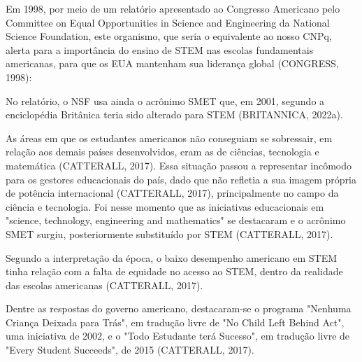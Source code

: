 Em 1998, por meio de um relatório apresentado ao Congresso Americano pelo Committee on Equal Opportunities in Science and Engineering da National Science Foundation, este organismo, que seria o equivalente ao nosso CNPq, alerta para a importância do ensino de STEM nas escolas fundamentais americanas, para que os EUA mantenham sua liderança global  (CONGRESS, 1998):


\noindent\begin{flushright}\mbox{\linespread{1}\selectfont\centering{}}\end{flushright}


No relatório, o NSF usa ainda o acrônimo SMET que, em 2001, segundo a enciclopédia Britânica teria sido alterado para STEM (BRITANNICA, 2022a).

As áreas em que os estudantes americanos não conseguiam se sobressair, em relação aos demais países desenvolvidos, eram as de ciências, tecnologia e matemática  (CATTERALL, 2017). Essa situação passou a representar incômodo para os gestores educacionais do país, dado que não refletia a sua imagem própria de potência internacional  (CATTERALL, 2017), principalmente no campo da ciência e tecnologia. Foi nesse momento que as iniciativas educacionais em "science, technology, engineering and mathematics" se destacaram e o acrônimo SMET surgiu, posteriormente substituído por STEM  (CATTERALL, 2017).

Segundo a interpretação da época, o baixo desempenho americano em STEM tinha relação com a falta de equidade no acesso ao STEM, dentro da realidade das escolas americanas  (CATTERALL, 2017).

Dentre as respostas do governo americano, destacaram-se o programa "Nenhuma Criança Deixada para Trás", em tradução livre de "No Child Left Behind Act", uma iniciativa de 2002, e o "Todo Estudante terá Sucesso", em tradução livre de "Every Student Succeeds", de 2015  (CATTERALL, 2017).

